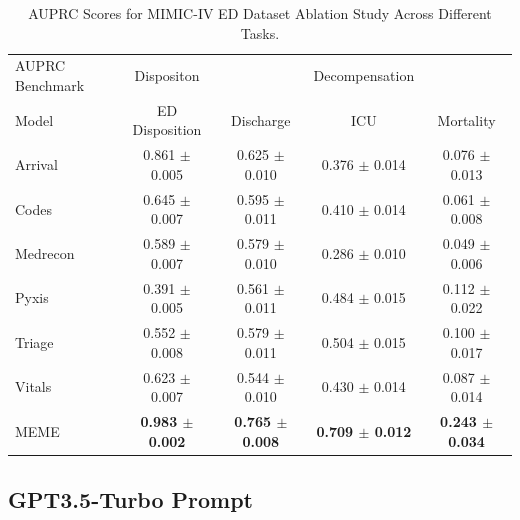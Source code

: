 \documentclass[pmlr]{jmlr}%
\begin{document}
\begin{table}[H]
\caption{AUPRC Scores for MIMIC-IV ED Dataset Ablation Study Across Different Tasks.}
\label{r6}
\begin{adjustbox}{width=\textwidth}
\begin{small}
\begin{tabular}{l|c|ccc}
\toprule
AUPRC Benchmark & Dispositon & & Decompensation &\\
Model & ED Disposition & Discharge & ICU & Mortality \\
\midrule
Arrival & 0.861 $\pm$ 0.005 & 0.625 $\pm$ 0.010 & 0.376 $\pm$ 0.014 & 0.076 $\pm$ 0.013 \\
Codes & 0.645 $\pm$ 0.007 & 0.595 $\pm$ 0.011 & 0.410 $\pm$ 0.014 & 0.061 $\pm$ 0.008 \\
Medrecon & 0.589 $\pm$ 0.007 & 0.579 $\pm$ 0.010 & 0.286 $\pm$ 0.010 & 0.049 $\pm$ 0.006 \\
Pyxis & 0.391 $\pm$ 0.005 & 0.561 $\pm$ 0.011 & 0.484 $\pm$ 0.015 & 0.112 $\pm$ 0.022 \\
Triage & 0.552 $\pm$ 0.008 & 0.579 $\pm$ 0.011 & 0.504 $\pm$ 0.015 & 0.100 $\pm$ 0.017 \\
Vitals & 0.623 $\pm$ 0.007 & 0.544 $\pm$ 0.010 & 0.430 $\pm$ 0.014 & 0.087 $\pm$ 0.014 \\
MEME & \textbf{0.983 $\pm$ 0.002} & \textbf{0.765 $\pm$ 0.008} & \textbf{0.709 $\pm$ 0.012} & \textbf{0.243 $\pm$ 0.034} \\

\bottomrule
\end{tabular}
\end{small}
\end{adjustbox}
\end{table}
\newpage
\subsection{GPT3.5-Turbo Prompt}
\end{document}

